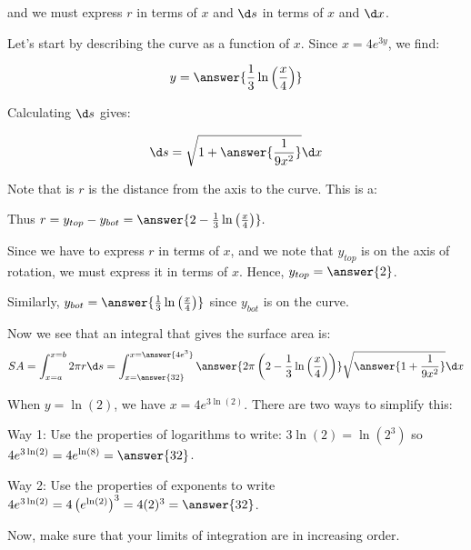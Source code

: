 \documentclass{ximera}
\begin{document}
\begin{exercise}
and we must express $r$ in terms of $x$ and $\d s$ in terms of $x$ and $\d x$.  


Let's start by describing the curve as a function of $x$.  Since $x=4e^{3y}$, we find:

\[
y= \answer{\frac{1}{3}\ln\left(\frac{x}{4}\right)}
\]

Calculating $\d s$ gives: 

\[
\d s = \sqrt{1+ \answer{\frac{1}{9x^2}}} \d x
\]


\begin{exercise}
Note that is $r$ is the distance from the axis to the curve. This is a:

\begin{multipleChoice}
\end{multipleChoice} 
Thus $r=y_{top}-y_{bot} = \answer{2-\frac{1}{3}\ln\left(\frac{x}{4}\right)}.$


\begin{hint}
Since we have to express $r$ in terms of $x$, and we note that $y_{top}$ is on the axis of rotation, we must express it in terms of $x$.  Hence, $y_{top} = \answer{2}$.

Similarly, $y_{bot} =\answer{ \frac{1}{3}\ln\left(\frac{x}{4}\right)}$ since $y_{bot}$ is on the curve.
\end{hint}



\end{exercise}

\begin{exercise}
Now we see that an integral that gives the surface area is: 
\[
SA= \int_{x=a}^{x=b} 2 \pi r \d s = \int_{x=\answer{32}}^{x=\answer{4e^3}} \answer{2 \pi \left(2-\frac{1}{3}\ln\left(\frac{x}{4}\right)\right)} \sqrt{\answer{1+\frac{1}{9x^2}}} \d x
\]

\begin{hint}
When $y=\ln(2)$, we have $x= 4e^{3 \ln(2)}$.  There are two ways to simplify this:

Way 1: Use the properties of logarithms to write: $3 \ln(2) = \ln\left(2^3\right)$ so $4e^{3 \ln(2)} = 4e^{\ln(8)} =\answer{32}$.

Way 2: Use the properties of exponents to write $4e^{3 \ln(2)} = 4\left(e^{\ln(2)}\right)^3 = 4(2)^3 = \answer{32}$.

Now, make sure that your limits of integration are in increasing order.
\end{hint}


\end{exercise}
\end{exercise}
\end{document}
